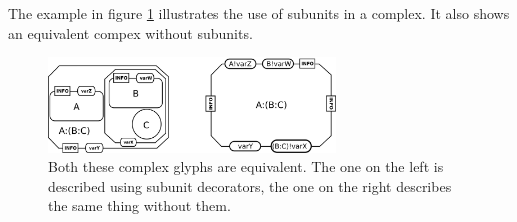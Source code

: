
The example in figure \ref{fig:techref:complexSubunits} illustrates the use of
subunits in a complex.  It also shows an equivalent compex without
subunits.

\begin{figure}[htb]
  \centering
  \includegraphics[width = 3.0in]{images/complex}
  \caption{Both these complex glyphs are equivalent. The one on the
    left is described using subunit decorators, the one on the right
    describes the same thing without them.}
  \label{fig:techref:complexSubunits}
\end{figure}


